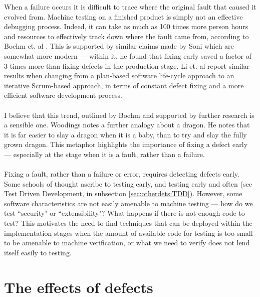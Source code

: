 When a failure occurs it is difficult to trace where the original fault that caused it evolved from.
Machine testing on a finished product is simply not an effective debugging process.
Indeed, it can take as much as 100 times more person hours and resources to effectively track down
where the fault came from, according to Boehm et. al \cite{boehm2005foundations}.
This is supported by similar claims made by Soni \cite{soni2006defect} which are somewhat more
modern --- within it, he found that fixing early saved a factor of 3 times more than fixing defects
in the production stage.
Li et. al \cite{li2010transition} report similar results when changing from a plan-based software
life-cycle approach to an iterative Scrum-based approach, in terms of constant defect fixing and a
more efficient software development process.\\
\\
I believe that this trend, outlined by Boehm and supported by further research is a sensible one.
Woodings \cite{terryLecture4220} notes a further analogy about a dragon.
He notes that it is far easier to slay a dragon when it is a baby, than to try and slay the fully
grown dragon.
This metaphor highlights the importance of fixing a defect early --- especially at the stage when it
is a fault, rather than a failure.\\
\\
Fixing a fault, rather than a failure or error, requires detecting defects early.
Some schools of thought ascribe to testing early, and testing early and often (see Test Driven Development, in
subsection \ref{sec:otherdets:TDD}).
However, some software characteristics are not easily amenable to machine testing --- how do we test
``security" or ``extensibility"?
What happens if there is not enough code to test?
This motivates the need to find techniques that can be deployed within the implementation stages
when the amount of available code for testing is too small to be amenable to machine verification,
or what we need to verify does not lend itself easily to testing.

\section{The effects of defects} \label{sec:defects:defEffects}


